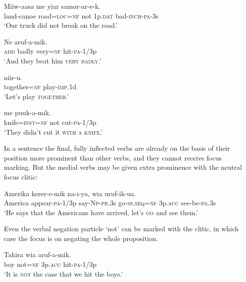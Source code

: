 \ea%
\label{ex:9:x1724}
\gll Miiw-aasa    me  yiar  samor-ar-e-k. \\
land-canoe  road=\textsc{loc}=\textsc{nf}  not  1p.\textsc{dat}  bad-\textsc{inch}-\textsc{pa}-3s      \\
\glt`Our truck did not break on the road.'
\z


\ea%
\label{ex:9:x1730}
\gll Ne    aruf-a-mik.\\
\textsc{add}  badly  very=\textsc{nf}  hit-\textsc{pa}-1/3p\\
\glt`And they beat him \textsc{very badly}.'
\z


\ea%
\label{ex:9:x1725}
\gll {}  niir-u. \\
together=\textsc{nf}  play-\textsc{imp}.1d      \\
\glt`Let's play \textsc{together}.'
\z


\ea%
\label{ex:9:x1726}
\gll {}  me  puuk-a-mik. \\
knife=\textsc{inst}=\textsc{nf}  not  cut-\textsc{pa}-1/3p      \\
\glt`They didn't cut it \textsc{with a knife}.'
\z


In a sentence the final, fully inflected verbs are already on the basis of their position more prominent than other verbs, and they cannot receive focus marking. But the medial verbs may be given extra prominence with the neutral focus clitic:

\ea%
\label{ex:9:x1727}
\gll Amerika  kerer-e-mik  na-i-ya,   wia  uruf-ik-ua.\\
America  appear-\textsc{pa}-1/3p  say-\textsc{Np}-\textsc{pr}.3s  go-\textsc{ss}.\textsc{seq}=\textsc{nf} 3p.\textsc{acc}  see-be-\textsc{pa}.3s     \\
\glt`He says that the Americans have arrived, let's \textsc{go} and see them.'
\z


Even the verbal negation particle  `not' can be marked with the  clitic, in which case the focus is on negating the whole proposition.

\ea%
\label{ex:9:x1728}
\gll Takira    wia  aruf-a-mik. \\
boy  not=\textsc{nf}  3p.\textsc{acc}  hit-\textsc{pa}-1/3p      \\
\glt`It is \textsc{not} the case that we hit the boys.'
\z


